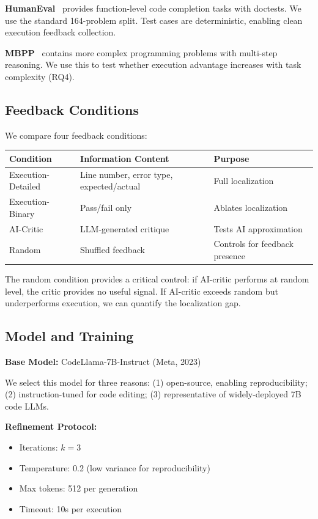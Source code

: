 \textbf{HumanEval}~\cite{chen2021humaneval} provides function-level code completion tasks with doctests. We use the standard 164-problem split. Test cases are deterministic, enabling clean execution feedback collection.

\textbf{MBPP}~\cite{austin2021mbpp} contains more complex programming problems with multi-step reasoning. We use this to test whether execution advantage increases with task complexity (RQ4).

\subsection{Feedback Conditions}

We compare four feedback conditions:

\begin{table}[h]
\centering
\begin{tabular}{lll}
\toprule
\textbf{Condition} & \textbf{Information Content} & \textbf{Purpose} \\
\midrule
Execution-Detailed & Line number, error type, expected/actual & Full localization \\
Execution-Binary & Pass/fail only & Ablates localization \\
AI-Critic & LLM-generated critique & Tests AI approximation \\
Random & Shuffled feedback & Controls for feedback presence \\
\bottomrule
\end{tabular}
\end{table}

The random condition provides a critical control: if AI-critic performs at random level, the critic provides no useful signal. If AI-critic exceeds random but underperforms execution, we can quantify the localization gap.

\subsection{Model and Training}

\textbf{Base Model:} CodeLlama-7B-Instruct (Meta, 2023)

We select this model for three reasons: (1) open-source, enabling reproducibility; (2) instruction-tuned for code editing; (3) representative of widely-deployed 7B code LLMs.

\textbf{Refinement Protocol:}
\begin{itemize}
\item Iterations: $k=3$
\item Temperature: 0.2 (low variance for reproducibility)
\item Max tokens: 512 per generation
\item Timeout: 10s per execution
\end{itemize}

